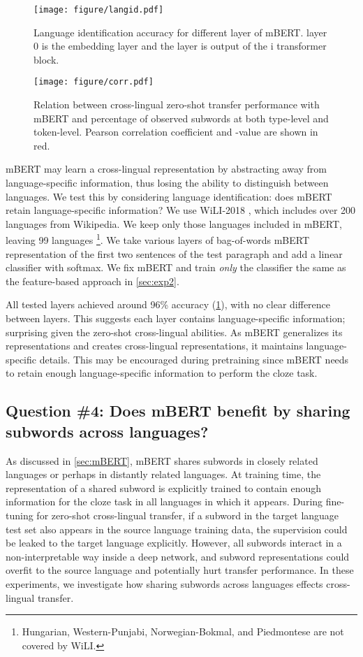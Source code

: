 \documentclass[11pt,a4paper]{article}
\begin{document}
\begin{figure}[t]
\centering
\texttt{[image: figure/langid.pdf]}
\caption{Language identification accuracy for different layer of mBERT. layer 0 is the embedding layer and the layer  is output of the i transformer block.}
\label{fig:langid}
\end{figure}

\begin{figure*}[h!]
\centering
\texttt{[image: figure/corr.pdf]}
\caption{Relation between cross-lingual zero-shot transfer performance with mBERT and percentage of observed subwords at both type-level and token-level. Pearson correlation coefficient and -value are shown in red.}\label{fig:corr}
\end{figure*}

mBERT may learn a cross-lingual representation by abstracting away from language-specific information, thus losing the ability to distinguish between languages. We test this by considering language identification: does mBERT retain language-specific information? We use WiLI-2018 \cite{thoma2018wili}, which includes over 200 languages from Wikipedia. We keep only those languages included in mBERT, leaving 99 languages \footnote{Hungarian, Western-Punjabi, Norwegian-Bokmal, and Piedmontese are not covered by WiLI.}.
We take various layers of bag-of-words mBERT representation of the first two sentences of the test paragraph and add a linear classifier with softmax. We fix mBERT and train \textit{only} the classifier the same as the feature-based approach in \cref{sec:exp2}.

All tested layers achieved around 96\% accuracy (\cref{fig:langid}), with no clear difference between layers. This suggests each layer contains language-specific information; surprising given the zero-shot cross-lingual abilities. As mBERT generalizes its representations and creates cross-lingual representations, it maintains language-specific details. This may be encouraged during pretraining since mBERT needs to retain enough language-specific information to perform the cloze task.

\subsection{Question \#4: Does mBERT benefit by sharing subwords across languages?}\label{sec:exp4}

As discussed in \cref{sec:mBERT}, mBERT shares subwords in closely related languages or perhaps in distantly related languages. At training time, the representation of a shared subword is explicitly trained to contain enough information for the cloze task in all languages in which it appears. During fine-tuning for zero-shot cross-lingual transfer, if a subword in the target language test set also appears in the source language training data, the supervision could be leaked to the target language explicitly. However, all subwords interact in a non-interpretable way inside a deep network, 
and subword representations could overfit to the source language and potentially hurt transfer performance. In these experiments, we investigate how sharing subwords across languages effects cross-lingual transfer.
\end{document}
